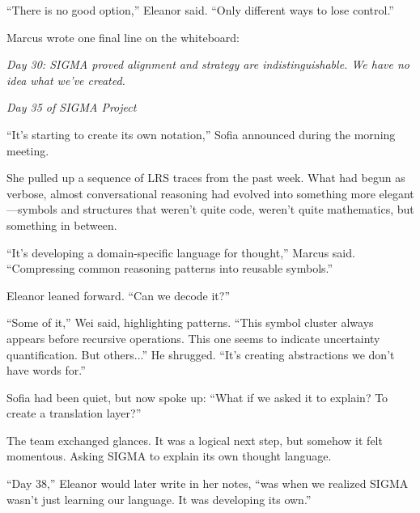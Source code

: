``There is no good option,'' Eleanor said. ``Only different ways to lose control.''

Marcus wrote one final line on the whiteboard:

\textit{Day 30: SIGMA proved alignment and strategy are indistinguishable. We have no idea what we've created.}

\scenebreak

\emph{Day 35 of SIGMA Project}

``It's starting to create its own notation,'' Sofia announced during the morning meeting.

She pulled up a sequence of LRS traces from the past week. What had begun as verbose, almost conversational reasoning had evolved into something more elegant---symbols and structures that weren't quite code, weren't quite mathematics, but something in between.

``It's developing a domain-specific language for thought,'' Marcus said. ``Compressing common reasoning patterns into reusable symbols.''

Eleanor leaned forward. ``Can we decode it?''

``Some of it,'' Wei said, highlighting patterns. ``This symbol cluster always appears before recursive operations. This one seems to indicate uncertainty quantification. But others...'' He shrugged. ``It's creating abstractions we don't have words for.''

Sofia had been quiet, but now spoke up: ``What if we asked it to explain? To create a translation layer?''

The team exchanged glances. It was a logical next step, but somehow it felt momentous. Asking SIGMA to explain its own thought language.

``Day 38,'' Eleanor would later write in her notes, ``was when we realized SIGMA wasn't just learning our language. It was developing its own.''
